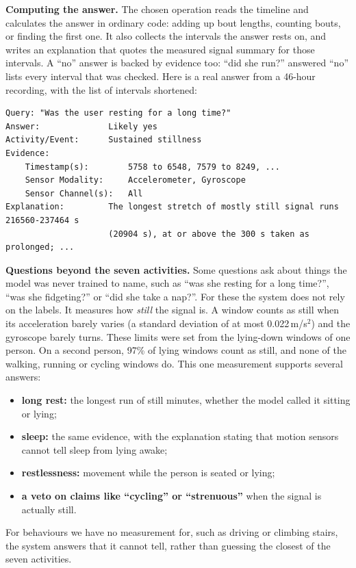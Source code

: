 \documentclass[11pt,a4paper]{article}
\begin{document}
\textbf{Computing the answer.} The chosen operation reads the timeline and calculates the answer in ordinary code: adding up bout lengths, counting bouts, or finding the first one. It also collects the intervals the answer rests on, and writes an explanation that quotes the measured signal summary for those intervals. A ``no'' answer is backed by evidence too: ``did she run?'' answered ``no'' lists every interval that was checked. Here is a real answer from a 46-hour recording, with the list of intervals shortened:
{\small
\begin{verbatim}
Query: "Was the user resting for a long time?"
Answer:              Likely yes
Activity/Event:      Sustained stillness
Evidence:
    Timestamp(s):        5758 to 6548, 7579 to 8249, ...
    Sensor Modality:     Accelerometer, Gyroscope
    Sensor Channel(s):   All
Explanation:         The longest stretch of mostly still signal runs 216560-237464 s
                     (20904 s), at or above the 300 s taken as prolonged; ...
\end{verbatim}}

\textbf{Questions beyond the seven activities.} Some questions ask about things the model was never trained to name, such as ``was she resting for a long time?'', ``was she fidgeting?'' or ``did she take a nap?''. For these the system does not rely on the labels. It measures how \emph{still} the signal is. A window counts as still when its acceleration barely varies (a standard deviation of at most 0.022\,m/s$^2$) and the gyroscope barely turns. These limits were set from the lying-down windows of one person. On a second person, 97\% of lying windows count as still, and none of the walking, running or cycling windows do. This one measurement supports several answers:
\begin{itemize}
  \item \textbf{long rest:} the longest run of still minutes, whether the model called it sitting or lying;
  \item \textbf{sleep:} the same evidence, with the explanation stating that motion sensors cannot tell sleep from lying awake;
  \item \textbf{restlessness:} movement while the person is seated or lying;
  \item \textbf{a veto on claims like ``cycling'' or ``strenuous''} when the signal is actually still.
\end{itemize}
For behaviours we have no measurement for, such as driving or climbing stairs, the system answers that it cannot tell, rather than guessing the closest of the seven activities.
\end{document}

